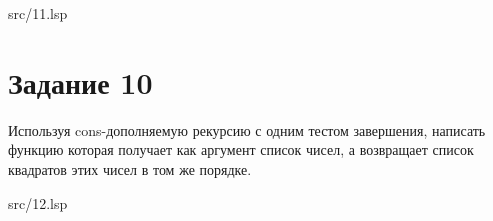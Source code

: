 \FloatBarrier
\begin{lstinputlisting}[style={lsp}]{src/11.lsp}
\end{lstinputlisting}
\FloatBarrier

\section*{Задание 10}
Используя cons-дополняемую рекурсию с одним тестом завершения,
написать функцию которая получает как аргумент список чисел, а возвращает список
квадратов этих чисел в том же порядке.

\FloatBarrier
\begin{lstinputlisting}[style={lsp}]{src/12.lsp}
\end{lstinputlisting}
\FloatBarrier